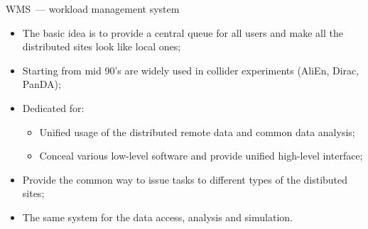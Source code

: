 \documentclass[18pt]{beamer}
\begin{document}
\begin{frame}{WMS~--- workload management system}
\begin{itemize}
  \item The basic idea is to provide a central queue for all users and make all the distributed sites look like local ones;
  \item Starting from mid 90's are widely used in collider experiments (AliEn, Dirac, PanDA);
  \item Dedicated for:
  \begin{itemize}
  \item Unified usage of the distributed remote data and common data analysis;
  \item Conceal various low-level software and provide unified high-level interface;
  \end{itemize}
  \item Provide the common way to issue tasks to different types of the distibuted sites;
  \item
  The same system for the data access, analysis and simulation.
\end{itemize}
\end{frame}
\end{document}
